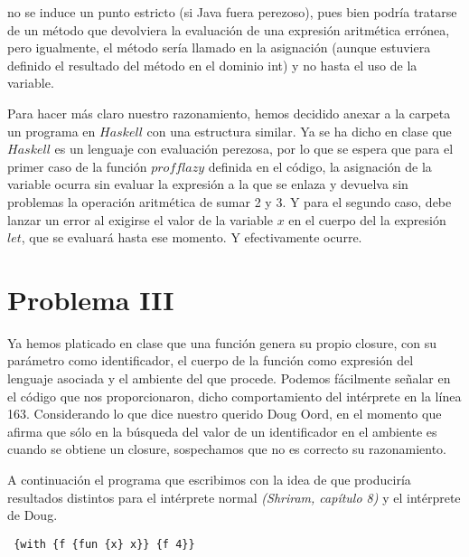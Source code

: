 \documentclass[12pt]{article}
\begin{document}
no se induce un punto estricto (si Java fuera perezoso), pues bien podría tratarse de un método  que devolviera la evaluación de una expresión
aritmética errónea, pero igualmente, el método sería llamado en la asignación (aunque estuviera definido el resultado del método en el dominio int)
y no hasta el uso de la variable.\par
Para hacer más claro nuestro razonamiento, hemos decidido anexar a la carpeta un programa en $Haskell$ con una estructura similar.
Ya se ha dicho en clase que $Haskell$ es un lenguaje con evaluación perezosa, por lo que se espera que para el primer caso de la función $profflazy$
definida en el código, la asignación de la variable ocurra sin evaluar la expresión a la que se enlaza y devuelva sin problemas la operación
aritmética de sumar 2 y 3. Y para
el segundo caso, debe lanzar un error al exigirse el valor de la variable $x$ en el cuerpo del la expresión $let$, que se evaluará hasta ese momento.
Y efectivamente ocurre. 

\section*{Problema III}
Ya hemos platicado en clase que una función genera su propio
closure, con su parámetro como identificador, el cuerpo de la función como expresión del lenguaje asociada y el ambiente del que procede.
Podemos fácilmente señalar en el código que nos proporcionaron, dicho comportamiento del intérprete en la línea 163.
Considerando lo que dice nuestro querido Doug Oord, en el momento que afirma que sólo en la búsqueda del valor de un identificador en el ambiente
es cuando se obtiene un closure, sospechamos que no es correcto su razonamiento. \par
A continuación el programa que escribimos con la idea de que produciría resultados distintos para el intérprete normal
\textit{(Shriram, capítulo 8)} y el intérprete de Doug. \par
\begin{verbatim}
 {with {f {fun {x} x}} {f 4}}
\end{verbatim}
\par
\end{document}
